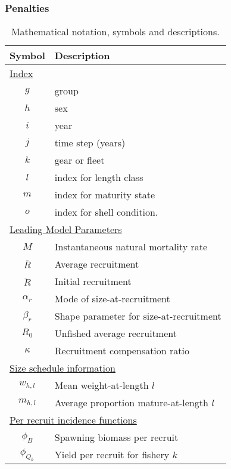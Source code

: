 \documentclass[12pt,letterpaper]{article}
\begin{document}
    \subsubsection{Penalties} %
    \label{ssub:penalties}
    
\begin{table}
  \centering
  \caption{Mathematical notation, symbols and descriptions.}
  \label{tab:notation}
  \begin{tabular}{cl}
  \hline
  Symbol  & Description \\
  \hline
  \multicolumn{2}{l}{\underline{Index}}\\
      $g$ & group \\
      $h$ & sex \\
      $i$ & year \\
      $j$ & time step (years) \\
      $k$ & gear or fleet \\
      $l$ & index for length class \\
      $m$ & index for maturity state \\
      $o$ & index for shell condition. \\
  \multicolumn{2}{l}{\underline{Leading Model Parameters}}\\
      $M$         & Instantaneous natural mortality rate\\
      $\bar{R}$   & Average recruitment\\
      $\ddot{R}$  & Initial recruitment\\
      $\alpha_r$  & Mode of size-at-recruitment\\
      $\beta_r $  & Shape parameter for size-at-recruitment\\
      $R_0$       & Unfished average recruitment\\
      $\kappa$    & Recruitment compensation ratio\\
  \multicolumn{2}{l}{\underline{Size schedule information}}\\
      $w_{h,l}$   & Mean weight-at-length $l$ \\
      $m_{h,l}$   & Average proportion mature-at-length $l$ \\
  \multicolumn{2}{l}{\underline{Per recruit incidence functions}} \\
      $\phi_B$    & Spawning biomass per recruit \\
      $\phi_{Q_k}$& Yield per recruit for fishery $k$\\

\end{tabular}
\end{table}
\end{document}
